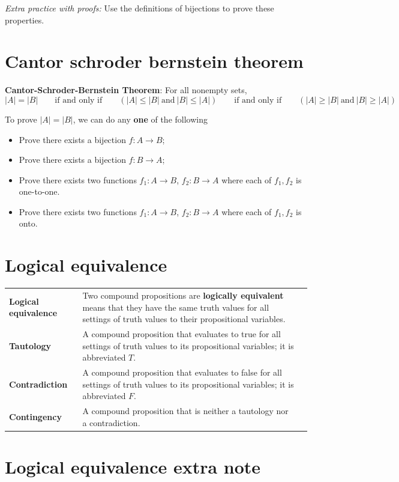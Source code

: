 \documentclass[12pt, oneside]{article}
\begin{document}
{\it Extra practice with proofs:} Use the definitions of bijections to prove these properties. \vfill
\section*{Cantor schroder bernstein theorem}


{\bf Cantor-Schroder-Bernstein Theorem}: For all nonempty sets,
\[
|A| = |B| \qquad\text{if and only if} \qquad (|A| \leq |B| ~\text{and}~ |B| \leq |A|)
\qquad\text{if and only if} \qquad (|A| \geq |B| ~\text{and}~ |B| \geq |A|)
\]

To prove $|A| = |B|$,  we can do any {\bf one} of the following

\begin{itemize}\setlength{\itemsep}{-5pt}
\item Prove there exists  a bijection $f:  A \to B$;
\item Prove there exists a  bijection  $f: B  \to  A$;
\item Prove there exists two functions $f_1: A \to B$, $f_2: B \to  A$ where each of $f_1, f_2$ is one-to-one.
\item Prove there exists two functions $f_1: A \to B$, $f_2: B \to  A$ where each of $f_1, f_2$ is onto.
\end{itemize} \vfill
\section*{Logical equivalence}


\begin{tabular}{lp{4in}p{2in}}
{\bf Logical equivalence } &Two compound  propositions are {\bf logically  equivalent} means that  they 
have the  same  truth  values for all settings of truth  values to their propositional  variables.\\
{\bf Tautology} & A compound proposition that evaluates to true
for all settings of truth  values to its propositional  variables; it is  abbreviated $T$.\\
{\bf Contradiction} & A compound proposition that  evaluates  to  false 
for  all settings of truth  values to its propositional  variables; it  is abbreviated $F$.\\
{\bf Contingency} & A compound proposition that is neither a tautology nor a contradiction.\\
\end{tabular}
 \vfill
\section*{Logical equivalence extra note}
\end{document}

